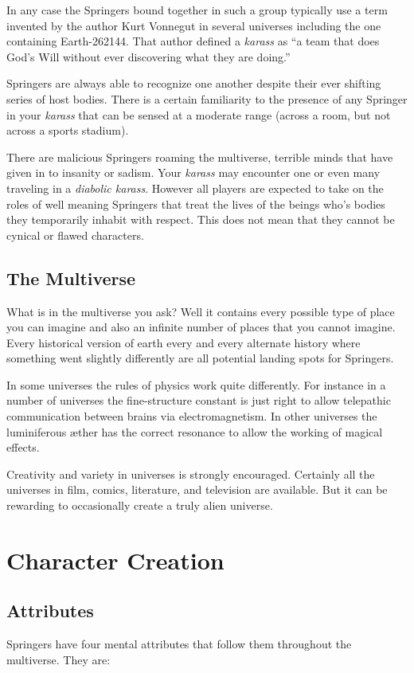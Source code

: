 \documentclass[letterpaper,12pt,landscape,twocolumn]{book}
\begin{document}
In any case the Springers bound together in such a group typically use
a term invented by the author Kurt Vonnegut in several universes
including the one containing Earth-262144. That author defined a \textit{karass}
as ``a team that does God's Will without ever discovering what they
are doing.'' 

Springers are always able to recognize one another despite their ever
shifting series of host bodies. There is a certain familiarity to the
presence of any Springer in your \textit{karass} that can be sensed at
a moderate range (across a room, but not across a sports stadium). 

There are malicious Springers roaming the
multiverse, terrible minds that have given in to insanity or
sadism. Your \textit{karass} may encounter one or even many traveling
in a \textit{diabolic karass}. However all players are expected to
take on the roles of well meaning Springers that treat the lives of
the beings who's bodies they temporarily inhabit with respect. This
does not mean that they cannot be cynical or flawed characters. 

\section{The Multiverse}

What is in the multiverse you ask? Well it contains every possible
type of place you can imagine and also an infinite number of
places that you cannot imagine. Every historical version of earth
every and every alternate history where something went slightly
differently are all potential landing spots for Springers.

In some universes the rules of physics work quite differently. For
instance in a number of universes the fine-structure constant is just
right to allow telepathic communication between brains via
electromagnetism. In other universes the luminiferous {\ae}ther has
the correct resonance to allow the working of magical effects. 

Creativity and variety in universes is strongly encouraged. Certainly
all the universes in film, comics, literature, and television are
available. But it can be rewarding to occasionally create a truly
alien universe.

\chapter{Character Creation}

\section{Attributes}
Springers have four mental attributes that follow them throughout the
multiverse. They are:
\end{document}
